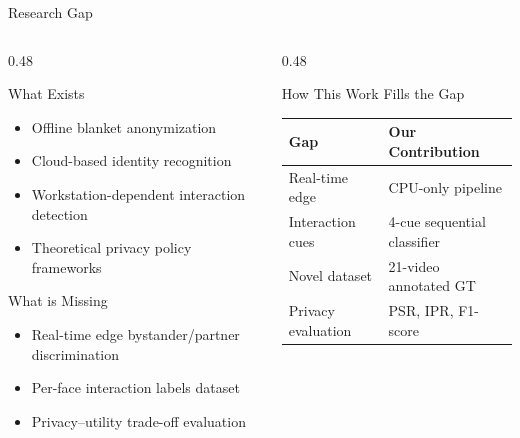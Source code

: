 \documentclass[aspectratio=169]{beamer}
\begin{document}
\begin{frame}{Research Gap}
\begin{columns}[T]
\begin{column}{0.48\textwidth}
  \begin{block}{What Exists}
    \begin{itemize}\setlength{\itemsep}{0.15cm}
      \item Offline blanket anonymization
      \item Cloud-based identity recognition
      \item Workstation-dependent interaction detection
      \item Theoretical privacy policy frameworks
    \end{itemize}
  \end{block}
  \vspace{0.3cm}
  \begin{alertblock}{What is Missing}
    \begin{itemize}\setlength{\itemsep}{0.15cm}
      \item Real-time edge bystander/partner discrimination
      \item Per-face interaction labels dataset
      \item Privacy–utility trade-off evaluation
    \end{itemize}
  \end{alertblock}
\end{column}
\begin{column}{0.48\textwidth}
  \vspace{0.3cm}
  \begin{block}{How This Work Fills the Gap}
    \renewcommand{\arraystretch}{1.4}
    \begin{tabular}{p{2.5cm}p{2.5cm}}
    \toprule
    \textbf{Gap} & \textbf{Our Contribution} \\
    \midrule
    Real-time edge     & CPU-only pipeline \\
    Interaction cues   & 4-cue sequential classifier \\
    Novel dataset      & 21-video annotated GT \\
    Privacy evaluation & PSR, IPR, F1-score \\
    \bottomrule
    \end{tabular}
  \end{block}
\end{column}
\end{columns}
\end{frame}
\end{document}

